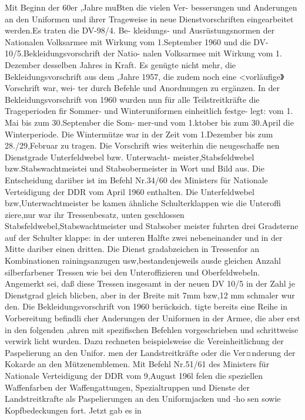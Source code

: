 

Mit Beginn der 60er ,Jahre muBten die vielen Ver-
besserungen und Anderungen an den Uniformen
und ihrer Trageweise in neue Dienstvorschriften
eingearbeitet werden.Es traten die DV-98/4. Be-
kleidungs- und Ausrüstungsnormen der Nationalen
Volksarmee mit Wirkung vom 1.September 1960
und die DV-10/5.Bekleidungsvorschrift der Natio-
nalen Volksarmee mit Wirkung vom 1. Dezember
desselben Jahres in Kraft. Es genügte nicht mehr,
die Bekleidungsvorschrift aus dem ,Jahre 1957, die
zudem noch eine <vorläufige》 Vorschrift war, wei-
ter durch Befehle und Anordnungen zu ergänzen.
In der Bekleidungsvorschrift von 1960 wurden
nun für alle Teilstreitkräfte die Trageperioden fir
Sommer- und Winteruniformen einheitlich festge-
legt: vom 1. Mai bis zum 30.September die Som-
mer-und vom 1.ktober bis zum 30.April die
Winterperiode. Die Wintermütze war in der Zeit vom 1.Dezember bis zum 28./29,Februar zu tragen.
Die Vorschrift wies weiterhin die neugeschaffe
nen Dienstgrade Unterfeldwebel bzw. Unterwacht-
meister,Stabsfeldwebel bzw.Stabswachtmeistei
und Stabsobermeister in Wort und Bild aus. Die
Entscheidung dariiber ist im Befehl Nr.34/60 des
Ministers für Nationale Verteidigung der DDR
vom April 1960 enthalten.
Die Unterfeldwebel bzw,Unterwachtmeister be
kamen ähnliche Schulterklappen wie die Unteroffi
ziere,nur war ihr Tressenbesatz, unten geschlossen
Stabsfeldwebel,Stabswachtmeister und Stabsober
meister fuhrten drei Gradsterne auf der Schulter
klappe: in der unteren Halfte zwei nebeneinander
und in der Mitte dariber einen dritten. Die Dienst
gradabzeichen in Tressenfor an Kombinationen
rainingsanzugen usw,bestandenjeweils ausde
gleichen Anzahl silberfarbener Tressen wie bei den
Unteroffizieren und Oberfeldwebeln. Angemerkt
sei, daß diese Tressen insgesamt in der neuen DV
10/5 in der Zahl je Dienstgrad gleich blicben, aber
in der Breite mit 7mm bzw,12 mm schmaler wur
den.
Die Bekleidungsvorschrift von 1960 berücksich.
tigte bereits eine Reihe in Vorbereitung befindli
cher Anderungen der Uniformen in der Armee, die
aber erst in den folgenden ,ahren mit spezifischen
Befehlen vorgeschrieben und schrittweise verwirk
licht wurden. Dazu rechneten beispielsweise dic
Vereinheitlichung der Paspelierung an den Unifor.
men der Landstreitkräfte oder die Ver¤nderung der
Kokarde an den Mützenemblemen.
Mit Befehl Nr.51/61 des Ministers für Nationale
Verteidigung der DDR vom 9,August 196l felen
die speziellen Waffenfarben der Waffengattungen,
Spezialtruppen und Dienste der Landstreitkrafte
als Paspelierungen an den Uniformjacken und -ho
sen sowie Kopfbedeckungen fort. Jetzt gab es in
